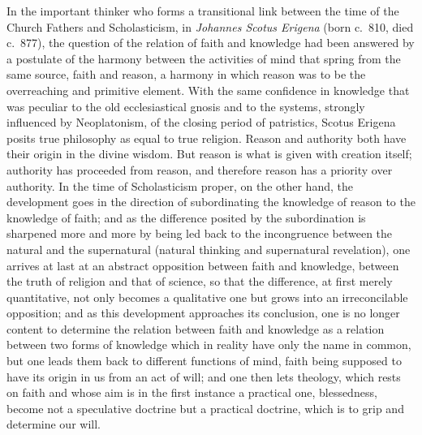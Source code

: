 In the important thinker who forms a transitional link between the time of the Church Fathers and Scholasticism, in \emph{Johannes Scotus Erigena} (born c.\ 810, died c.\ 877), the question of the relation of faith and knowledge had been answered by a postulate of the harmony between the activities of mind that spring from the same source, faith and reason, a harmony in which reason was to be the overreaching and primitive element. With the same confidence in knowledge that was peculiar to the old ecclesiastical gnosis and to the systems, strongly influenced by Neoplatonism, of the closing period of patristics, Scotus Erigena posits true philosophy as equal to true religion. Reason and authority both have their origin in the divine wisdom. But reason is what is given with creation itself; authority has proceeded from reason, and therefore reason has a priority over authority. In the time of Scholasticism proper, on the other hand, the development goes in the direction of subordinating the knowledge of reason to the knowledge of faith; and as the difference posited by the subordination is sharpened more and more by being led back to the incongruence between the natural and the supernatural (natural thinking and supernatural revelation), one arrives at last at an abstract opposition between faith and knowledge, between the truth of religion and that of science, so that the difference, at first merely quantitative, not only becomes a qualitative one but grows into an irreconcilable opposition; and as this development approaches its conclusion, one is no longer content to determine the relation between faith and knowledge as a relation between two forms of knowledge which in reality have only the name in common, but one leads them back to different functions of mind, faith being supposed to have its origin in us from an act of will; and one then lets theology, which rests on faith and whose aim is in the first instance a practical one, blessedness, become not a speculative doctrine but a practical doctrine, which is to grip and determine our will.

